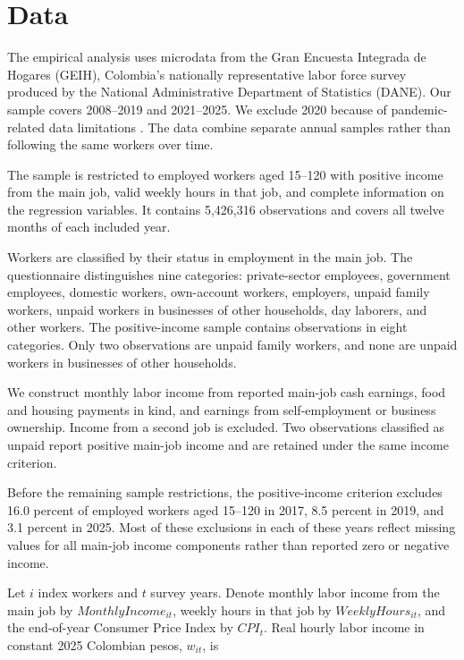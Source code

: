 \section{Data}

The empirical analysis uses microdata from the Gran Encuesta Integrada de Hogares (GEIH), Colombia's nationally representative labor force survey produced by the National Administrative Department of Statistics (DANE). Our sample covers 2008--2019 and 2021--2025. We exclude 2020 because of pandemic-related data limitations \citep{DANE2020GEIH}. The data combine separate annual samples rather than following the same workers over time.

The sample is restricted to employed workers aged 15--120 with positive income from the main job, valid weekly hours in that job, and complete information on the regression variables. It contains 5,426,316 observations and covers all twelve months of each included year.

Workers are classified by their status in employment in the main job. The questionnaire distinguishes nine categories: private-sector employees, government employees, domestic workers, own-account workers, employers, unpaid family workers, unpaid workers in businesses of other households, day laborers, and other workers. The positive-income sample contains observations in eight categories. Only two observations are unpaid family workers, and none are unpaid workers in businesses of other households.

We construct monthly labor income from reported main-job cash earnings, food and housing payments in kind, and earnings from self-employment or business ownership. Income from a second job is excluded. Two observations classified as unpaid report positive main-job income and are retained under the same income criterion.

Before the remaining sample restrictions, the positive-income criterion excludes
16.0 percent of employed workers aged 15--120 in 2017, 8.5 percent in 2019,
and 3.1 percent in 2025. Most of these exclusions in each of these years
reflect missing values for all main-job income components rather than reported zero or negative income.

Let \(i\) index workers and \(t\) survey years. Denote monthly labor income from the main job by \(MonthlyIncome_{it}\), weekly hours in that job by \(WeeklyHours_{it}\), and the end-of-year Consumer Price Index by \(CPI_t\). Real hourly labor income in constant 2025 Colombian pesos, \(w_{it}\), is

